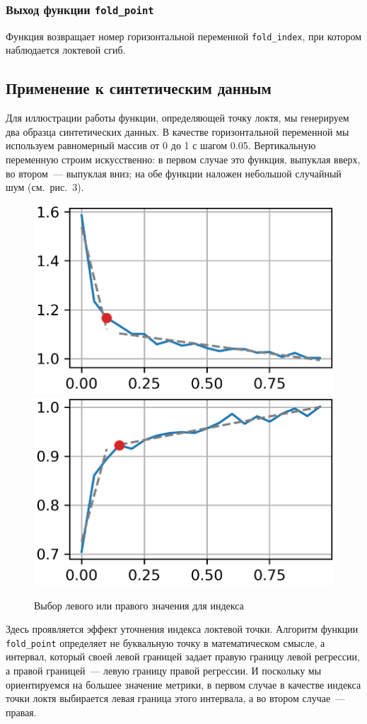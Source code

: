 \documentclass[a4paper,12pt]{article}
\begin{document}
\subsubsection{Выход функции \texttt{fold\_point}}

Функция возвращает номер горизонтальной переменной \texttt{fold\_index}, при котором наблюдается локтевой сгиб.


\subsection{Применение к синтетическим данным}

Для иллюстрации работы функции, определяющей точку локтя, мы генерируем два образца синтетических данных. В качестве горизонтальной переменной мы используем равномерный массив от 0 до 1 с шагом 0.05. Вертикальную переменную строим искусственно: в первом случае это функция, выпуклая вверх, во втором — выпуклая вниз; на обе функции наложен небольшой случайный шум (см. рис. 3).

\begin{figure}[!h]
	\centering
	\includegraphics[width=0.4\linewidth]{pictures/Локоть слева}
	\hspace{0.05\linewidth}
	\includegraphics[width=0.4\linewidth]{pictures/Локоть справа}\\
	\caption{Выбор левого или правого значения для индекса}
\end{figure}

Здесь проявляется эффект уточнения индекса локтевой точки. Алгоритм функции \texttt{fold\_point}  определяет не буквальную точку в математическом смысле, а интервал, который своей левой границей задает правую границу левой регрессии, а правой границей — левую границу правой регрессии. И поскольку мы ориентируемся на большее значение метрики, в первом случае в качестве индекса точки локтя выбирается левая граница этого интервала, а во втором случае — правая.
\end{document}
